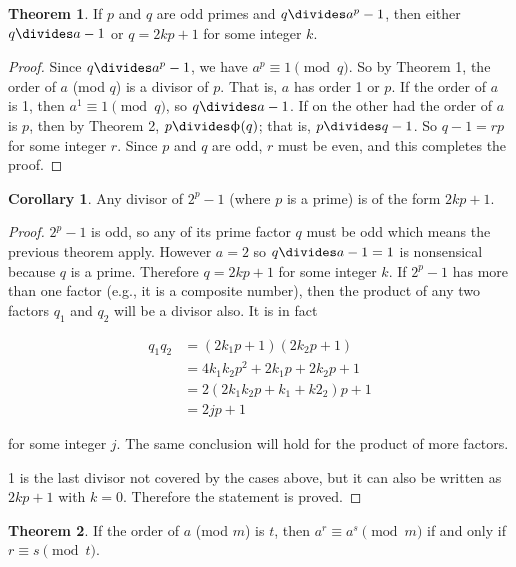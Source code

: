 \documentclass{article}
\theoremstyle{definition} %
\newtheorem{theorem}{Theorem}[section] %
\theoremstyle{definition}
\newtheorem{corollary}{Corollary}[section] %
\theoremstyle{definition}
\newcommand{\tot}{\upphi}
\theoremstyle{definition}
\begin{document}
  \begin{theorem}
    If $p$ and $q$ are odd primes and $q \divides a^p - 1$, then either $q \divides a - 1$ or $q = 2kp + 1$
    for some integer $k$.
  \end{theorem}
  
  \begin{proof}
    Since $q \divides a^p - 1$, we have $a^p \equiv 1 \pmod{q}$. So by Theorem 1, the order of $a$ (mod $q$)
    is a divisor of $p$. That is, $a$ has order 1 or $p$. If the order of $a$ is 1, then $a^1 \equiv 1 \pmod{q}$,
    so $q \divides a - 1$. If on the other had the order of $a$ is $p$, then by Theorem 2, $p \divides \tot(q)$;
    that is, $p \divides q - 1$. So $q - 1 = rp$ for some integer $r$. Since $p$ and $q$ are odd, $r$ must be even,
    and this completes the proof.
  \end{proof}
  
  \begin{corollary}
    Any divisor of $2^p - 1$ (where $p$ is a prime) is of the form $2kp + 1$.
  \end{corollary}
  
  \begin{proof}
    $2^p - 1$ is odd, so any of its prime factor $q$ must be odd which means the previous theorem apply. However
    $a = 2$ so $q \divides a - 1 = 1$ is nonsensical because $q$ is a prime. Therefore $q = 2kp + 1$ for
    some integer $k$. If $2^p - 1$ has more than one factor (e.g., it is a composite number), then the product
    of any two factors $q_1$ and $q_2$ will be a divisor also. It is in fact
    
    \begin{align*}
      q_1q_2 &= (2k_1p + 1)(2k_2p + 1) \\
        &= 4k_1k_2p^2 + 2k_1p + 2k_2p + 1 \\
        &= 2(2k_1k_2p + k_1 + k2_2)p + 1 \\
        &= 2jp + 1
    \end{align*}
    
    for some integer $j$. The same conclusion will hold for the product of more factors.
    
    1 is the last divisor not covered by the cases above, but it can also be written as $2kp + 1$ with
    $k = 0$. Therefore the statement is proved.
  \end{proof}
  
  \begin{theorem}
    If the order of $a$ (mod $m$) is $t$, then $a^r \equiv a^s \pmod{m}$ if and only if $r \equiv s \pmod{t}$.
  \end{theorem}
  
\end{document}
